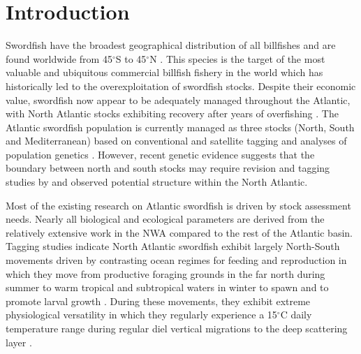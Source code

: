 \section{Introduction}%

Swordfish have the broadest geographical distribution of all billfishes \citep{Braun2015} and are found worldwide from 45$^{\circ}$S to 45$^{\circ}$N \citep{Palko1981}. This species is the target of the most valuable and ubiquitous commercial billfish fishery in the world \citep{FAO2012} which has historically led to the overexploitation of swordfish stocks. Despite their economic value, swordfish now appear to be adequately managed throughout the Atlantic, with North Atlantic stocks exhibiting recovery after years of overfishing \citep{Neilson2013, Collette2011}. The Atlantic swordfish population is currently managed as three stocks (North, South and Mediterranean) based on conventional \citep{Garcia-Cortes2003} and satellite \citep{Neilson2009, Abascal2015} tagging and analyses of population genetics \citep{Bremer1996, AlvaradoBremer2005a, Smith2015}. However, recent genetic evidence suggests that the boundary between north and south stocks may require revision \citep{Smith2015} and tagging studies by \citet{Neilson2009} and \citet{Abascal2015} observed potential structure within the North Atlantic.

Most of the existing research on Atlantic swordfish is driven by stock assessment needs. Nearly all biological and ecological parameters are derived from the relatively extensive work in the NWA compared to the rest of the Atlantic basin. Tagging studies indicate North Atlantic swordfish exhibit largely North-South movements driven by contrasting ocean regimes for feeding and reproduction \citep{Sedberry2001, Neilson2009, Abascal2015} in which they move from productive foraging grounds in the far north during summer to warm tropical and subtropical waters in winter to spawn and to promote larval growth \citep{Arocha1995}. During these movements, they exhibit extreme physiological versatility in which they regularly experience a 15$^{\circ}$C daily temperature range \citep{Abascal2015} during regular diel vertical migrations \citep{Carey1981, Lerner2013} to the deep scattering layer \citep{Carey1990a, Josse1998}. 


